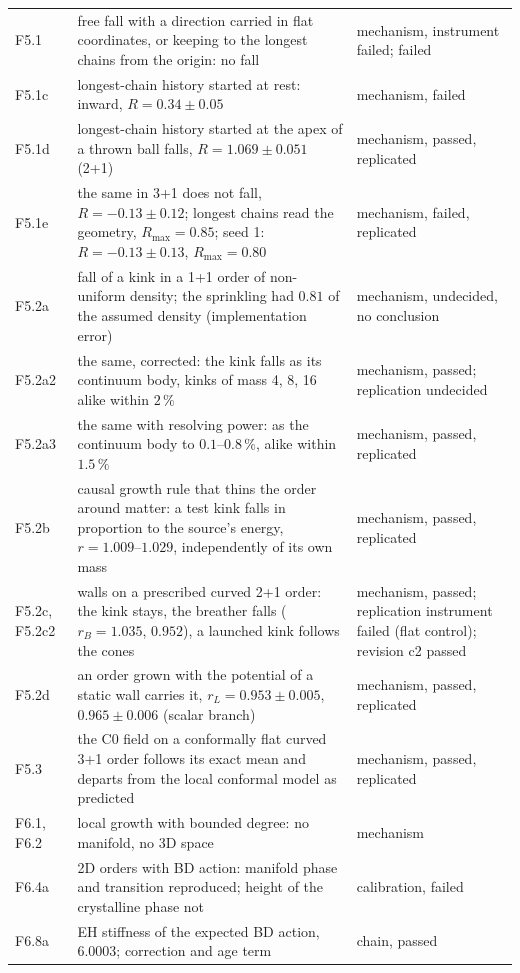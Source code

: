 {\begin{xltabular}{\linewidth}{>{\raggedright\arraybackslash}p{1.9cm}>{\raggedright\arraybackslash}X>{\raggedright\arraybackslash}p{3.0cm}}
F5.1 & free fall with a direction carried in flat coordinates, or keeping to the longest chains from the origin: no fall & mechanism, instrument failed; failed\\
F5.1c & longest-chain history started at rest: inward, $R=0.34\pm0.05$ & mechanism, failed\\
F5.1d & longest-chain history started at the apex of a thrown ball falls, $R=1.069\pm0.051$ (2+1) & mechanism, passed, replicated\\
F5.1e & the same in 3+1 does not fall, $R=-0.13\pm0.12$; longest chains read the geometry, $R_{\max}=0.85$; seed 1: $R=-0.13\pm0.13$, $R_{\max}=0.80$ & mechanism, failed, replicated\\
F5.2a & fall of a kink in a 1+1 order of non-uniform density; the sprinkling had $0.81$ of the assumed density (implementation error) & mechanism, undecided, no conclusion\\
F5.2a2 & the same, corrected: the kink falls as its continuum body, kinks of mass 4, 8, 16 alike within $2\,\%$ & mechanism, passed; replication undecided\\
F5.2a3 & the same with resolving power: as the continuum body to $0.1$--$0.8\,\%$, alike within $1.5\,\%$ & mechanism, passed, replicated\\
F5.2b & causal growth rule that thins the order around matter: a test kink falls in proportion to the source's energy, $r=1.009$--$1.029$, independently of its own mass & mechanism, passed, replicated\\
F5.2c, F5.2c2 & walls on a prescribed curved 2+1 order: the kink stays, the breather falls ($r_B=1.035$, $0.952$), a launched kink follows the cones & mechanism, passed; replication instrument failed (flat control); revision c2 passed\\
F5.2d & an order grown with the potential of a static wall carries it, $r_L=0.953\pm0.005$, $0.965\pm0.006$ (scalar branch) & mechanism, passed, replicated\\
F5.3 & the C0 field on a conformally flat curved 3+1 order follows its exact mean and departs from the local conformal model as predicted & mechanism, passed, replicated\\
F6.1, F6.2 & local growth with bounded degree: no manifold, no 3D space & mechanism\\
F6.4a & 2D orders with BD action: manifold phase and transition reproduced; height of the crystalline
  phase not & calibration, failed\\
F6.8a & EH stiffness of the expected BD action, $6.0003$; correction and age term & chain, passed\\

\end{xltabular}}
